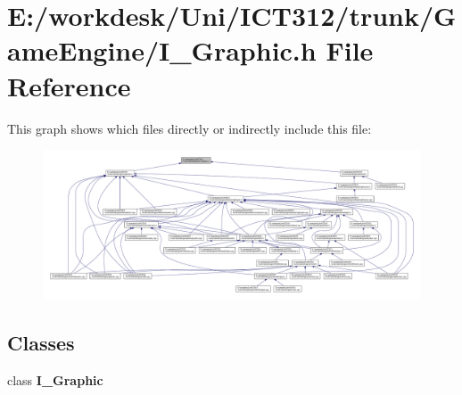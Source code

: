 \section{E\+:/workdesk/\+Uni/\+I\+C\+T312/trunk/\+Game\+Engine/\+I\+\_\+\+Graphic.h File Reference}
\label{_i___graphic_8h}
This graph shows which files directly or indirectly include this file\+:
\nopagebreak
\begin{figure}[H]
\begin{center}
\leavevmode
\includegraphics[width=350pt]{dd/db1/_i___graphic_8h__dep__incl}
\end{center}
\end{figure}
\subsection*{Classes}
\begin{DoxyCompactItemize}
\item 
class {\bf I\+\_\+\+Graphic}
\end{DoxyCompactItemize}
